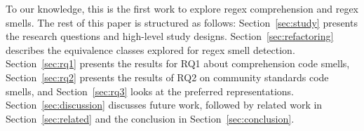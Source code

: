To our knowledge, this is the first work to explore regex comprehension and regex smells. 
The rest of this paper is structured as follows:
Section~\ref{sec:study} presents the research questions and high-level study designs.
Section~\ref{sec:refactoring} describes the equivalence classes explored for regex smell detection.
Section~\ref{sec:rq1} presents the results for RQ1 about comprehension code smells,
Section~\ref{sec:rq2} presents the results of RQ2 on community standards code smells, and
Section~\ref{sec:rq3} looks at the preferred representations.
Section~\ref{sec:discussion} discusses future work, followed by related work in Section~\ref{sec:related} and the conclusion in Section~\ref{sec:conclusion}.
%
